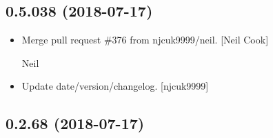\documentclass[a4paper,10pt,english]{report}
\begin{document}
\subsection{0.5.038 (2018-07-17)}
\label{\detokenize{misc/changelog:id389}}\begin{itemize}
\item {} 
Merge pull request \#376 from njcuk9999/neil. {[}Neil Cook{]}

Neil

\item {} 
Update date/version/changelog. {[}njcuk9999{]}

\end{itemize}


\subsection{0.2.68 (2018-07-17)}
\end{document}
